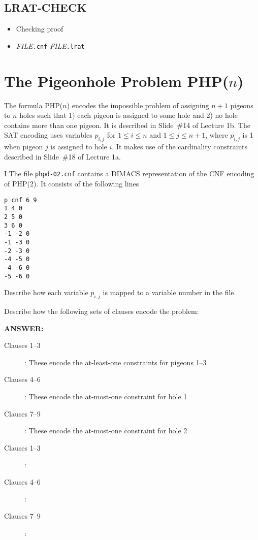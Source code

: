 \subsection*{LRAT-CHECK}

\begin{itemize}
\item Checking proof
\item[] {\it FILE}\texttt{.cnf} {\it FILE}\texttt{.lrat}
\end{itemize}



\newpage

\section*{The Pigeonhole Problem PHP($n$)}


The formula PHP($n$) encodes the impossible problem of assigning $n+1$
pigeons to $n$ holes such that 1) each pigeon is assigned to some hole
and 2) no hole contains more than one pigeon.  It is described in
Slide~\#14 of Lecture 1b.  The SAT encoding uses variables $p_{i,j}$
for $1 \leq i \leq n$ and $1 \leq j \leq n+1$, where $p_{i,j}$ is 1
when pigeon $j$ is assigned to hole $i$.  It makes use of
the cardinality constraints described in Slide~\#18 of Lecture 1a.
\medskip

\begin{problem}{I}
The file \texttt{phpd-02.cnf} contains
a DIMACS representation of the CNF encoding of PHP(2).
It consists of the following lines
\begin{lstlisting}
p cnf 6 9
1 4 0
2 5 0
3 6 0
-1 -2 0
-1 -3 0
-2 -3 0
-4 -5 0
-4 -6 0
-5 -6 0
\end{lstlisting}

\begin{choice}
\item Describe how each variable $p_{i,j}$ is mapped to a variable number in the file.

\item Describe how the following sets of clauses encode the problem:

\ifshowsolutions
$\;$\\[1ex]{\bf ANSWER:}
  \begin{description}
    \item[Clauses 1--3]: These encode the at-least-one constraints for pigeons 1--3
    \item[Clauses 4--6]: These encode the at-most-one constraint for hole 1
    \item[Clauses 7--9]: These encode the at-most-one constraint for hole 2
  \end{description}
\else
  \begin{description}
    \item[Clauses 1--3]:
    \item[Clauses 4--6]:
    \item[Clauses 7--9]:
  \end{description}
\fi
\end{choice}
\end{problem}

